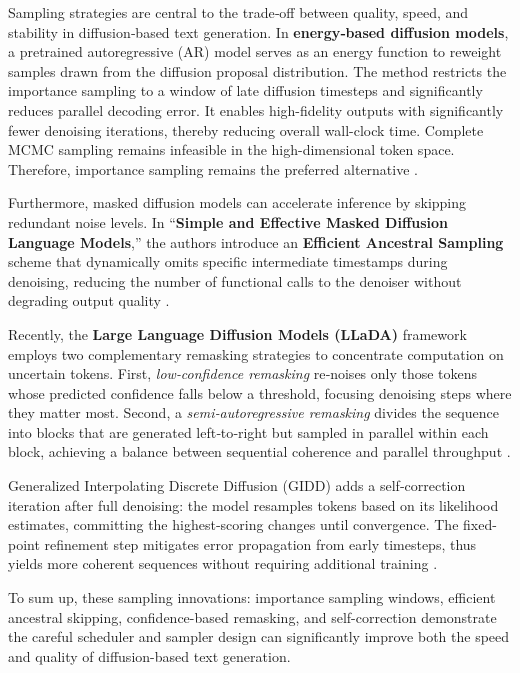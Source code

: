 Sampling strategies are central to the trade‐off between quality, speed, and stability in diffusion‐based text generation. In \textbf{energy‐based diffusion models}, a pretrained autoregressive (AR) model serves as an energy function to reweight samples drawn from the diffusion proposal distribution. The method restricts the importance sampling to a window of late diffusion timesteps and significantly reduces parallel decoding error. It enables high-fidelity outputs with significantly fewer denoising iterations, thereby reducing overall wall-clock time. Complete MCMC sampling remains infeasible in the high-dimensional token space. Therefore, importance sampling remains the preferred alternative \cite {xu_energy-based_2025}.  



Furthermore, masked diffusion models can accelerate inference by skipping redundant noise levels. In “\textbf{Simple and Effective Masked Diffusion Language Models},” the authors introduce an \textbf{Efficient Ancestral Sampling} scheme that dynamically omits specific intermediate timestamps during denoising, reducing the number of functional calls to the denoiser without degrading output quality \cite{sahoo_simple_2024}.  



Recently, the \textbf{Large Language Diffusion Models (LLaDA)} framework employs two complementary remasking strategies to concentrate computation on uncertain tokens. First, \emph{low‐confidence remasking} re‐noises only those tokens whose predicted confidence falls below a threshold, focusing denoising steps where they matter most. Second, a \emph{semi‐autoregressive remasking} divides the sequence into blocks that are generated left‐to‐right but sampled in parallel within each block, achieving a balance between sequential coherence and parallel throughput \cite{nie_large_2025}.  



Generalized Interpolating Discrete Diffusion (GIDD) adds a self‐correction iteration after full denoising: the model resamples tokens based on its likelihood estimates, committing the highest‐scoring changes until convergence. The fixed-point refinement step mitigates error propagation from early timesteps, thus yields more coherent sequences without requiring additional training \cite {rutte_generalized_2025}.  



To sum up, these sampling innovations: importance sampling windows, efficient ancestral skipping, confidence-based remasking, and self-correction demonstrate the careful scheduler and sampler design can significantly improve both the speed and quality of diffusion-based text generation.  



% 

% 

